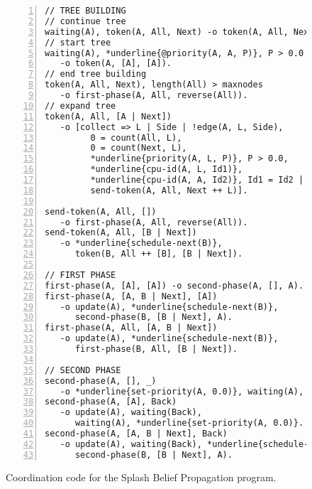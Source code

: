 \begin{figure}[h!]
\small\begin{Verbatim}[numbers=left,commandchars=*\{\}]
// TREE BUILDING
// continue tree
waiting(A), token(A, All, Next) -o token(A, All, Next).
// start tree
waiting(A), *underline{@priority(A, A, P)}, P > 0.0
   -o token(A, [A], [A]).
// end tree building
token(A, All, Next), length(All) > maxnodes
   -o first-phase(A, All, reverse(All)).
// expand tree
token(A, All, [A | Next])
   -o [collect => L | Side | !edge(A, L, Side),
         0 = count(All, L),
         0 = count(Next, L),
         *underline{priority(A, L, P)}, P > 0.0,
         *underline{cpu-id(A, L, Id1)},
         *underline{cpu-id(A, A, Id2)}, Id1 = Id2 |
         send-token(A, All, Next ++ L)].

send-token(A, All, [])
   -o first-phase(A, All, reverse(All)).
send-token(A, All, [B | Next])
   -o *underline{schedule-next(B)},
      token(B, All ++ [B], [B | Next]).

// FIRST PHASE
first-phase(A, [A], [A]) -o second-phase(A, [], A).
first-phase(A, [A, B | Next], [A])
   -o update(A), *underline{schedule-next(B)},
      second-phase(B, [B | Next], A).
first-phase(A, All, [A, B | Next])
   -o update(A), *underline{schedule-next(B)},
      first-phase(B, All, [B | Next]).

// SECOND PHASE
second-phase(A, [], _)
   -o *underline{set-priority(A, 0.0)}, waiting(A), update(A).
second-phase(A, [A], Back)
   -o update(A), waiting(Back),
      waiting(A), *underline{set-priority(A, 0.0)}.
second-phase(A, [A, B | Next], Back)
   -o update(A), waiting(Back), *underline{schedule-next(B)},
      second-phase(B, [B | Next], A).
\end{Verbatim}
  \caption{Coordination code for the Splash Belief Propagation program.}
  \label{code:sbp}
\end{figure}
\normalsize


